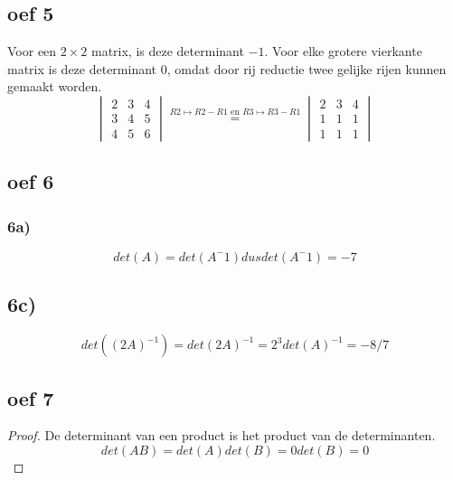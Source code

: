 \documentclass[10pt,a4paper]{article}
\begin{document}
\subsection*{oef 5}
Voor een $2\times2$ matrix, is deze determinant $-1$.
Voor elke grotere vierkante matrix is deze determinant $0$, omdat door rij reductie twee gelijke rijen kunnen gemaakt worden.
\[
\begin{vmatrix}
2 & 3 & 4\\
3 & 4 & 5\\
4 & 5 & 6
\end{vmatrix}
\overset{R2 \longmapsto R2-R1 \text{ en } R3 \longmapsto R3 - R1}{=}
\begin{vmatrix}
2 & 3 & 4\\
1 & 1 & 1\\
1 & 1 & 1
\end{vmatrix}
\]
\subsection*{oef 6}
\subsubsection*{6a)}
\[
det(A) = det(A^-1)
dus det(A^-1) = -7
\]
\subsection*{6c)}
\[ det((2A)^{-1}) = det(2A)^{-1} = 2^{3}det(A)^{-1} = -8/7\]
\subsection*{oef 7}
\begin{proof}
De determinant van een product is het product van de determinanten.
\[
det(AB) = det(A) det(B) = 0 det(B) = 0 
\]
\end{proof}
\end{document}
